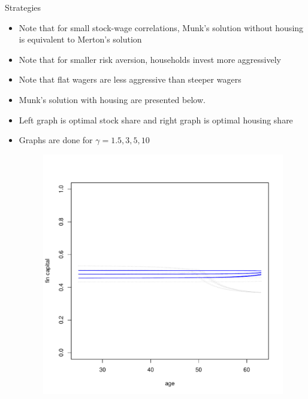 \documentclass{beamer}
\begin{document}
\begin{frame}[allowframebreaks]{Strategies}
\begin{itemize}
\framebreak

	\item Note that for small stock-wage correlations, Munk's solution without housing is equivalent to Merton's solution
	\item Note that for smaller risk aversion, households invest more aggressively
	\item Note that flat wagers are less aggressive than steeper wagers
	\item Munk's solution with housing are presented below.
	\item Left graph is optimal stock share and right graph is optimal housing share
	\item Graphs are done for $\gamma=1.5,3,5,10$
\framebreak

\begin{figure}[H]
		\includegraphics[scale=0.25]{figs/smunkhouse15.pdf}

\end{figure}
\end{itemize}
\end{frame}
\end{document}
